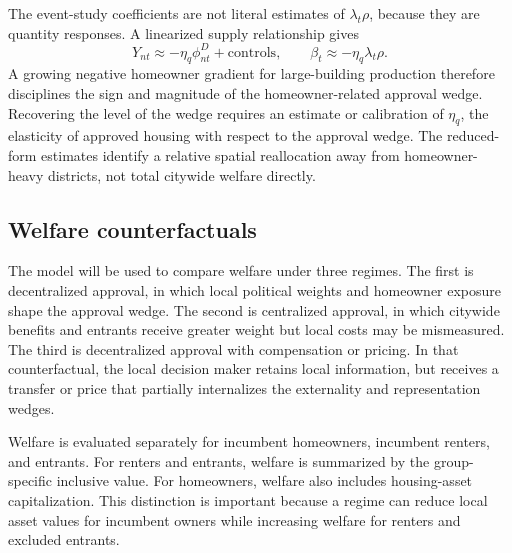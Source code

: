 The event-study coefficients are not literal estimates of \(\lambda_t\rho\), because they are quantity responses.
A linearized supply relationship gives
\[
    Y_{nt}
    \approx
    -\eta_q\phi_{nt}^D+\text{controls},
    \qquad
    \beta_t
    \approx
    -\eta_q\lambda_t\rho.
\]
A growing negative homeowner gradient for large-building production therefore disciplines the sign and magnitude of the homeowner-related approval wedge.
Recovering the level of the wedge requires an estimate or calibration of \(\eta_q\), the elasticity of approved housing with respect to the approval wedge.
The reduced-form estimates identify a relative spatial reallocation away from homeowner-heavy districts, not total citywide welfare directly.

\subsection{Welfare counterfactuals}

The model will be used to compare welfare under three regimes.
The first is decentralized approval, in which local political weights and homeowner exposure shape the approval wedge.
The second is centralized approval, in which citywide benefits and entrants receive greater weight but local costs may be mismeasured.
The third is decentralized approval with compensation or pricing.
In that counterfactual, the local decision maker retains local information, but receives a transfer or price that partially internalizes the externality and representation wedges.

Welfare is evaluated separately for incumbent homeowners, incumbent renters, and entrants.
For renters and entrants, welfare is summarized by the group-specific inclusive value.
For homeowners, welfare also includes housing-asset capitalization.
This distinction is important because a regime can reduce local asset values for incumbent owners while increasing welfare for renters and excluded entrants.
